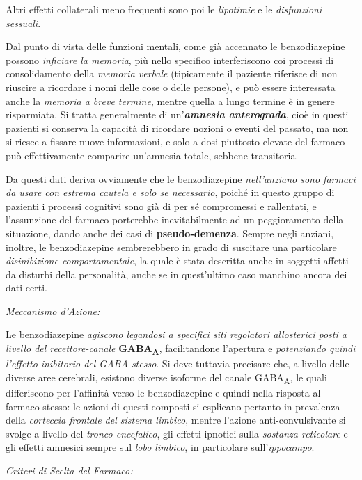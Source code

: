 \documentclass[]{article}
\begin{document}
Altri effetti collaterali meno frequenti sono poi le \emph{lipotimie} e
le \emph{disfunzioni sessuali}.

Dal punto di vista delle funzioni mentali, come già accennato le
benzodiazepine possono \emph{inficiare la memoria}, più nello specifico
interferiscono coi processi di consolidamento della \emph{memoria
verbale} (tipicamente il paziente riferisce di non riuscire a ricordare
i nomi delle cose o delle persone), e può essere interessata anche la
\emph{memoria a breve termine}, mentre quella a lungo termine è in
genere risparmiata. Si tratta generalmente di un'\textbf{\emph{amnesia
anterograda}}, cioè in questi pazienti si conserva la capacità di
ricordare nozioni o eventi del passato, ma non si riesce a fissare nuove
informazioni, e solo a dosi piuttosto elevate del farmaco può
effettivamente comparire un'amnesia totale, sebbene transitoria.

Da questi dati deriva ovviamente che le benzodiazepine
\emph{nell'anziano sono farmaci da usare con estrema cautela e solo se
necessario}, poiché in questo gruppo di pazienti i processi cognitivi
sono già di per sé compromessi e rallentati, e l'assunzione del farmaco
porterebbe inevitabilmente ad un peggioramento della situazione, dando
anche dei casi di \textbf{pseudo-demenza}. Sempre negli anziani,
inoltre, le benzodiazepine sembrerebbero in grado di suscitare una
particolare \emph{disinibizione comportamentale}, la quale è stata
descritta anche in soggetti affetti da disturbi della personalità, anche
se in quest'ultimo caso manchino ancora dei dati certi.

\emph{\emph{Meccanismo d'Azione:}}

Le benzodiazepine \emph{agiscono legandosi a specifici siti regolatori
allosterici posti a livello del recettore-canale}
\textbf{GABA\textsubscript{A}}, facilitandone l'apertura e
\emph{potenziando quindi l'effetto inibitorio del GABA stesso}. Si deve
tuttavia precisare che, a livello delle diverse aree cerebrali, esistono
diverse isoforme del canale GABA\textsubscript{A}, le quali differiscono
per l'affinità verso le benzodiazepine e quindi nella risposta al
farmaco stesso: le azioni di questi composti si esplicano pertanto in
prevalenza della \emph{corteccia frontale del sistema limbico}, mentre
l'azione anti-convulsivante si svolge a livello del \emph{tronco
encefalico}, gli effetti ipnotici sulla \emph{sostanza reticolare} e gli
effetti amnesici sempre sul \emph{lobo limbico}, in particolare
sull'\emph{ippocampo}.

\emph{\emph{Criteri di Scelta del Farmaco:}}
\end{document}
